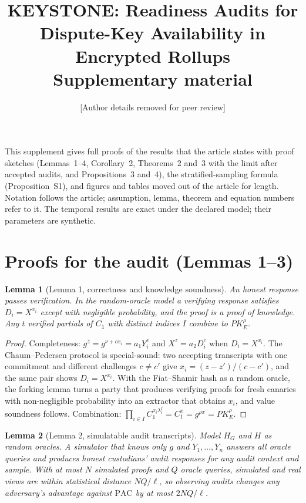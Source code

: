 \documentclass[11pt]{article}
\title{KEYSTONE: Readiness Audits for Dispute-Key Availability in Encrypted Rollups\\[4pt]
\large Supplementary material}
\author{[Author details removed for peer review]}
\date{}
\newtheorem*{lemmaS}{Lemma}
\newcommand{\PAC}{\mathrm{PAC}}
\begin{document}
\maketitle

\noindent This supplement gives full proofs of the results that the article states with proof sketches (Lemmas~1--4, Corollary~2, Theorems~2 and~3 with the limit after accepted audits, and Propositions~3 and~4), the stratified-sampling formula (Proposition~S1), and figures and tables moved out of the article for length. Notation follows the article; assumption, lemma, theorem and equation numbers refer to it. The temporal results are exact under the declared model; their parameters are synthetic.

\section{Proofs for the audit (Lemmas 1--3)}

\begin{lemmaS}[Lemma 1, correctness and knowledge soundness]
An honest response passes verification. In the random-oracle model a verifying response satisfies $D_i=X^{x_i}$ except with negligible probability, and the proof is a proof of knowledge. Any $t$ verified partials of $C_1$ with distinct indices $I$ combine to $PK_E^{\rho}$.
\end{lemmaS}

\begin{proof}
Completeness: $g^{z}=g^{\nu+cx_i}=a_1Y_i^{c}$ and $X^{z}=a_2D_i^{c}$ when $D_i=X^{x_i}$. The Chaum--Pedersen protocol is special-sound: two accepting transcripts with one commitment and different challenges $c\neq c'$ give $x_i=(z-z')/(c-c')$, and the same pair shows $D_i=X^{x_i}$. With the Fiat--Shamir hash as a random oracle, the forking lemma turns a party that produces verifying proofs for fresh canaries with non-negligible probability into an extractor that obtains $x_i$, and value soundness follows\cite{chaum1992dleq,fiat1987prove}. Combination: $\prod_{i\in I}C_1^{x_i\lambda_i^I}=C_1^{x}=g^{\rho x}=PK_E^{\rho}$.
\end{proof}

\begin{lemmaS}[Lemma 2, simulatable audit transcripts]
Model $H_G$ and $H$ as random oracles. A simulator that knows only $g$ and $Y_1,\dots,Y_n$ answers all oracle queries and produces honest custodians' audit responses for any audit context and sample. With at most $N$ simulated proofs and $Q$ oracle queries, simulated and real views are within statistical distance $NQ/\ell$, so observing audits changes any adversary's advantage against $\PAC$ by at most $2NQ/\ell$.
\end{lemmaS}
\end{document}
